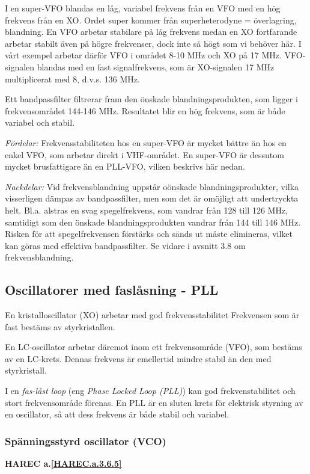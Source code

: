 I en super-VFO blandas en låg, variabel frekvens från en VFO med en
hög frekvens från en XO. Ordet super kommer från superheterodyne =
överlagring, blandning.  En VFO arbetar stabilare på låg frekvens
medan en XO fortfarande arbetar stabilt även på högre frekvenser, dock
inte så högt som vi behöver här. I vårt exempel arbetar därför VFO i
området 8-10 MHz och XO på 17 MHz. VFO-signalen blandas med en fast
signalfrekvens, som är XO-signalen 17 MHz multiplicerat med 8,
d.v.s. 136 MHz.

Ett bandpassfilter filtrerar fram den önskade blandningsprodukten, som
ligger i frekvensområdet 144-146 MHz. Resultatet blir en hög frekvens,
som är både variabel och stabil.

\emph{Fördelar:} Frekvensstabiliteten hos en super-VFO är mycket
bättre än hos en enkel VFO, som arbetar direkt i VHF-området. En
super-VFO är dessutom mycket brusfattigare än en PLL-VFO, vilken
beskrivs här nedan.

\emph{Nackdelar:} Vid frekvensblandning uppstår oönskade
blandningsprodukter, vilka visserligen dämpas av bandpassfilter, men
som det är omöjligt att undertryckta helt. Bl.a. alstras en svag
spegelfrekvens, som vandrar från 128 till 126 MHz, samtidigt som den
önskade blandningsprodukten vandrar från 144 till 146 MHz. Risken
för att spegelfrekvensen förstärks och sänds ut måste elimineras,
vilket kan göras med effektiva bandpassfilter. Se vidare i avsnitt 3.8
om frekvensblandning.

\subsection{Oscillatorer med faslåsning - PLL}

En kristalloscillator (XO) arbetar med god frekvensstabilitet
Frekvensen som är fast bestäms av styrkristallen.

En LC-oscillator arbetar däremot inom ett frekvensområde (VFO), som
bestäms av en LC-krets. Dennas frekvens är emellertid mindre stabil än
den med styrkristall.

I en \emph{fas-låst loop} (eng \emph{Phase Locked Loop (PLL)}) kan god
frekvenstabilitet och stort frekvensområde förenas. En PLL är en sluten krets
för elektrisk styrning av en oscillator, så att dess frekvens är både stabil och
variabel.

\subsubsection{Spänningsstyrd oscillator (VCO)}
\textbf{HAREC a.\ref{HAREC.a.3.6.5}\label{myHAREC.a.3.6.5}}


